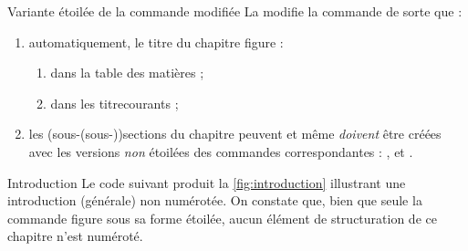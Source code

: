 
\begin{dbremark}{Variante étoilée de la commande \protect{} modifiée}{}
  La \yatcl{} modifie la commande  de sorte que :
  \begin{enumerate}
  \item automatiquement, le titre du chapitre figure :
    \begin{enumerate}
    \item dans la table des matières ;
    \item dans les \glspl{titrecourant} ;
    \end{enumerate}
  \item les (sous-(sous-))sections du chapitre peuvent et même \emph{doivent}
    être créées avec les versions \emph{non} étoilées des commandes
    correspondantes : ,  et
    .
  \end{enumerate}
\end{dbremark}

\begin{dbexample}{Introduction}{}
  Le code suivant produit la \vref{fig:introduction} illustrant une
  introduction (générale) non numérotée. On constate que, bien que seule la
  commande  figure sous sa forme étoilée, aucun élément
  de structuration de ce chapitre n'est numéroté.
\end{dbexample}

